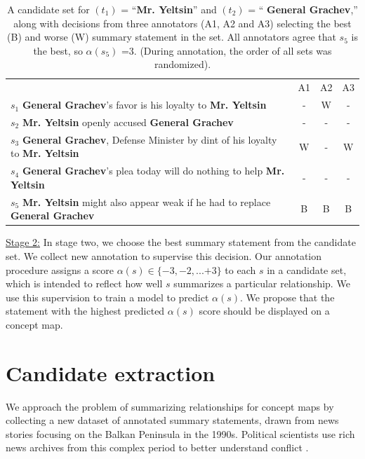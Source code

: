 \documentclass[11pt,a4paper]{article}
\begin{document}
\begin{table}[htb!]
\begin{tabular}{l | ccc}
   & A1  &  A2 & A3 \\
$s_1$ {\color{t2}\textbf{General Grachev}}'s favor is his loyalty to {\color{t1}\textbf{Mr. Yeltsin}} & - & W  & - \\
$s_2$ {\color{t1}\textbf{Mr. Yeltsin}} openly accused {\color{t2} \textbf{General Grachev}}         & -  &  -   &  - \\
$s_3$ {\color{t2}\textbf{General Grachev}}, Defense Minister by dint of his loyalty to {\color{t1}\textbf{Mr. Yeltsin}}         &   W     & - & W \\
$s_4$ {\color{t2}\textbf{General Grachev}}'s plea today will do nothing to help {\color{t1}\textbf{Mr. Yeltsin}}        &   -     &  -& -  \\
$s_5$ {\color{t1}\textbf{Mr. Yeltsin}} might also appear weak if he had to replace {\color{t2} \textbf{General Grachev}}      &  B       &  B &  B \\
\end{tabular}
\caption{A candidate set for $(t_1)$ = ``{\color{t1}\textbf{Mr. Yeltsin}}'' and $(t_2)$ = ``{\color{t2} \textbf{General Grachev}},'' along with decisions from three annotators (A1, A2 and A3) selecting the best (B) and worse (W) summary statement in the set. All annotators agree that $s_5$ is the best, so $\alpha(s_5)$ =3. (During annotation, the order of all sets was randomized).}
\label{t:matrix}
\end{table}

\underline{Stage 2:} In stage two, we choose the best summary statement from the candidate set. We collect new annotation to supervise this decision. Our annotation procedure assigns a score $\alpha(s) \in \{-3,-2, ... {+3}\}$ to each $s$ in a candidate set, which is intended to reflect how well $s$ summarizes a particular relationship. We use this supervision to train a model to predict $\alpha(s)$. We propose that the statement with the highest predicted $\alpha(s)$ score should be displayed on a concept map. 

\section{Candidate extraction}\label{s:dataset}

We approach the problem of summarizing relationships for concept maps by collecting a new dataset of annotated summary statements, drawn from news stories focusing on the Balkan Peninsula in the 1990s. Political scientists use rich news archives from this complex period to better understand conflict \cite{schrodt2001analyzing}.
\end{document}
